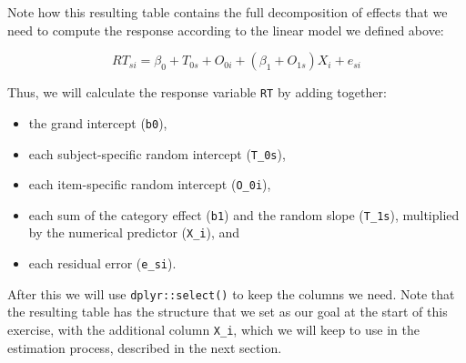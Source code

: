\documentclass[
  english,
  doc,floatsintext]{apa6}
\newenvironment{Shaded}{\begin{snugshade}}{\end{snugshade}}
\newcommand{\CommentTok}[1]{\textcolor[rgb]{0.56,0.35,0.01}{\textit{#1}}}
\newcommand{\DataTypeTok}[1]{\textcolor[rgb]{0.13,0.29,0.53}{#1}}
\newcommand{\KeywordTok}[1]{\textcolor[rgb]{0.13,0.29,0.53}{\textbf{#1}}}
\newcommand{\NormalTok}[1]{#1}
\newcommand{\OperatorTok}[1]{\textcolor[rgb]{0.81,0.36,0.00}{\textbf{#1}}}
\newcommand{\StringTok}[1]{\textcolor[rgb]{0.31,0.60,0.02}{#1}}
\providecommand{\tightlist}{%
  \setlength{\itemsep}{0pt}\setlength{\parskip}{0pt}}
\begin{document}
Note how this resulting table contains the full decomposition of effects that we need to compute the response according to the linear model we defined above:

\begin{equation}
RT_{si} = \beta_0 + T_{0s} + O_{0i} + \left(\beta_1 + O_{1s}\right) X_i + e_{si}
\end{equation}

Thus, we will calculate the response variable \texttt{RT} by adding together:

\begin{itemize}
\tightlist
\item
  the grand intercept (\texttt{b0}),
\item
  each subject-specific random intercept (\texttt{T\_0s}),
\item
  each item-specific random intercept (\texttt{O\_0i}),
\item
  each sum of the category effect (\texttt{b1}) and the random slope (\texttt{T\_1s}), multiplied by the numerical predictor (\texttt{X\_i}), and
\item
  each residual error (\texttt{e\_si}).
\end{itemize}

After this we will use \texttt{dplyr::select()} to keep the columns we need. Note that the resulting table has the structure that we set as our goal at the start of this exercise, with the additional column \texttt{X\_i}, which we will keep to use in the estimation process, described in the next section.

\begin{Shaded}
\end{Shaded}
\end{document}
